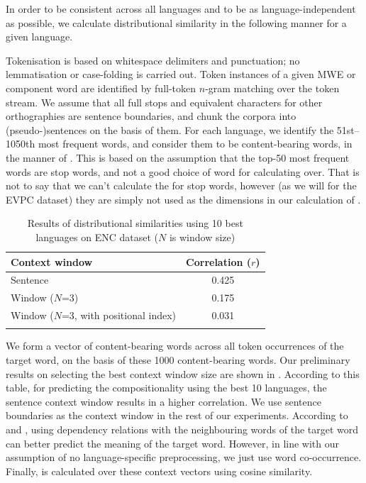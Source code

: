 \documentclass[output=paper,modfonts,nonflat]{langsci/langscibook}
\begin{document}
In order to be consistent across all languages and to be as
language-independent as possible, we calculate distributional
similarity in the following manner for a given language.

Tokenisation is based on whitespace delimiters and punctuation; no
lemmatisation or case-folding is carried out. Token instances of a
given MWE or component word are identified by full-token $n$-gram
matching over the token stream. We assume that all full stops and
equivalent characters for other orthographies are sentence boundaries,
and chunk the corpora into (pseudo-)sentences on the basis of
them. For each language, we identify the 51st--1050th most frequent
words, and consider them to be content-bearing words, in the manner of
\citet{Schutze:1997}. This is based on the assumption that the top-50
most frequent words are stop words, and not a good choice of word for
calculating  over. That is not to say that we
can't calculate the  for stop words, however
(as we will for the EVPC dataset) they are simply not used as the
dimensions in our calculation of .

\begin{table}[t]
\begin{center}
\begin{tabular}{l c} 
\lsptoprule
Context window &Correlation ($r$) \\\midrule
Sentence & 0.425 \\
Window ($N$=3) & 0.175 \\
Window ($N$=3, with positional index) & 0.031 \\
\lspbottomrule
\end{tabular}
\caption{\label{tab:ds:premResult} Results of distributional similarities using 10 best languages on ENC dataset ($N$ is window size)}
\end{center}
\end{table}


We form a vector of content-bearing words across all token occurrences
of the target word, on the basis of these 1000 content-bearing words. Our
preliminary results on selecting the best context window size are
shown in . According to this table, for
predicting the compositionality using the best 10 languages, the
sentence context window results in a higher correlation. We use
sentence boundaries as the context window in the rest of our
experiments. According to \citet{weeds2003} and
\citet{Pado:Lapata:2007}, using dependency relations with the
neighbouring words of the target word can better predict the meaning
of the target word. However, in line with our assumption of no
language-specific preprocessing, we just use word
co-occurrence. Finally,  is calculated over
these context vectors using cosine similarity.
\end{document}

